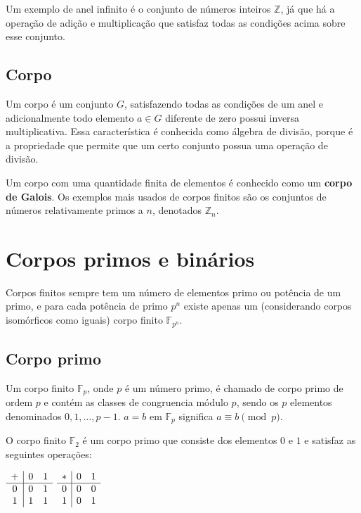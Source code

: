 \documentclass[12pt]{article}
\begin{document}
Um exemplo de anel infinito é o conjunto de números inteiros $\mathbb{Z}$, já
que há a operação de adição e multiplicação que satisfaz todas as condições
acima sobre esse conjunto.

\subsection{Corpo}

Um corpo é um conjunto $G$, satisfazendo todas as condições de um anel e
adicionalmente todo elemento $a \in G$ diferente de zero possui inversa
multiplicativa. Essa característica é conhecida como álgebra de divisão, porque
é a propriedade que permite que um certo conjunto possua uma operação de
divisão.

Um corpo com uma quantidade finita de elementos é conhecido como um
\textbf{corpo de Galois}. Os exemplos mais usados de corpos finitos são os
conjuntos de números relativamente primos a $n$, denotados $\mathbb{Z}_{n}$.

\section{Corpos primos e binários}

Corpos finitos sempre tem um número de elementos primo ou potência de um primo,
e para cada potência de primo $p^{n}$ existe apenas um (considerando corpos
isomórficos como iguais) corpo finito $\mathbb{F}_{p^{n}}$.

\subsection{Corpo primo}

Um corpo finito $\mathbb{F}_{p}$, onde $p$ é um número primo, é chamado de
corpo primo de ordem $p$ e contém as classes de congruencia módulo $p$, sendo
os $p$ elementos denominados $0, 1, \ldots, p-1$. $a = b$ em $\mathbb{F}_{p}$
significa $a \equiv b \pmod{p}$.

O corpo finito $\mathbb{F}_{2}$ é um corpo primo que consiste dos elementos $0$
e $1$ e satisfaz as seguintes operações:

\begin{center}
    $\begin{array}{ c | c c }
        + & 0 & 1 \\ \hline
        0 & 0 & 1 \\
        1 & 1 & 1
    \end{array}$
    \hspace{4em}
    $\begin{array}{ c | c c }
        * & 0 & 1 \\ \hline
        0 & 0 & 0 \\
        1 & 0 & 1
    \end{array}$
\end{center}
\end{document}
